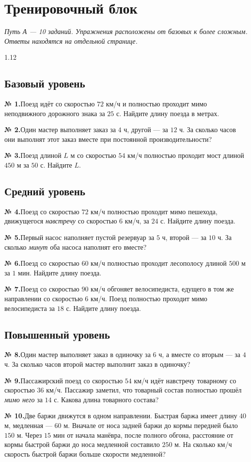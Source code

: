 \documentclass[a4paper,12pt]{article}
\newcommand{\task}[2]{\par\smallskip\noindent\textbf{№ #1.}\enspace #2\par}
\begin{document}
\clearpage
\section*{Тренировочный блок}
\textit{Путь А --- 10 заданий. Упражнения расположены от базовых к более сложным. Ответы находятся на отдельной странице.}

\begin{spacing}{1.12}\small
\subsection*{Базовый уровень}
\task{1}{Поезд идёт со скоростью $72$ км/ч и полностью проходит мимо неподвижного дорожного знака за $25$ с. Найдите длину поезда в метрах.}

\task{2}{Один мастер выполняет заказ за $4$ ч, другой --- за $12$ ч. За сколько часов они выполнят этот заказ вместе при постоянной производительности?}

\task{3}{Поезд длиной $L$ м со скоростью $54$ км/ч полностью проходит мост длиной $450$ м за $50$ с. Найдите $L$.}

\subsection*{Средний уровень}
\task{4}{Поезд со скоростью $72$ км/ч полностью проходит мимо пешехода, движущегося \emph{навстречу} со скоростью $6$ км/ч, за $24$ с. Найдите длину поезда.}

\task{5}{Первый насос наполняет пустой резервуар за $5$ ч, второй --- за $10$ ч. За сколько \emph{минут} оба насоса наполнят его вместе?}

\task{6}{Поезд со скоростью $60$ км/ч полностью проходит лесополосу длиной $500$ м за $1$ мин. Найдите длину поезда.}

\task{7}{Поезд со скоростью $90$ км/ч обгоняет велосипедиста, едущего в том же направлении со скоростью $6$ км/ч. Поезд полностью проходит мимо велосипедиста за $18$ с. Найдите длину поезда.}

\subsection*{Повышенный уровень}
\task{8}{Один мастер выполняет заказ в одиночку за $6$ ч, а вместе со вторым --- за $4$ ч. За сколько часов второй мастер выполнит заказ в одиночку?}

\task{9}{Пассажирский поезд со скоростью $54$ км/ч идёт навстречу товарному со скоростью $36$ км/ч. Пассажир заметил, что товарный состав полностью прошёл \emph{мимо него} за $14$ с. Какова длина товарного состава?}

\task{10}{Две баржи движутся в одном направлении. Быстрая баржа имеет длину $40$ м, медленная --- $60$ м. Вначале от носа задней баржи до кормы передней было $150$ м. Через $15$ мин от начала манёвра, после полного обгона, расстояние от кормы быстрой баржи до носа медленной составило $250$ м. На сколько км/ч скорость быстрой баржи больше скорости медленной?}

\end{spacing}
\clearpage
\end{document}
